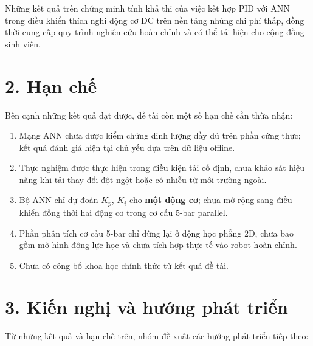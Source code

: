 Những kết quả trên chứng minh tính khả thi của việc kết hợp PID với ANN trong
điều khiển thích nghi động cơ DC trên nền tảng nhúng chi phí thấp, đồng thời
cung cấp quy trình nghiên cứu hoàn chỉnh và có thể tái hiện cho cộng đồng sinh viên.


\section*{2. Hạn chế}

Bên cạnh những kết quả đạt được, đề tài còn một số hạn chế cần thừa nhận:

\begin{enumerate}[leftmargin=1.5cm, label=\arabic*.]
    \item Mạng ANN chưa được kiểm chứng định lượng đầy đủ trên phần cứng thực;
    kết quả đánh giá hiện tại chủ yếu dựa trên dữ liệu offline.

    \item Thực nghiệm được thực hiện trong điều kiện tải cố định, chưa khảo sát
    hiệu năng khi tải thay đổi đột ngột hoặc có nhiễu từ môi trường ngoài.

    \item Bộ ANN chỉ dự đoán $K_p$, $K_i$ cho \textbf{một động cơ}; chưa mở rộng
    sang điều khiển đồng thời hai động cơ trong cơ cấu 5-bar parallel.

    \item Phần phân tích cơ cấu 5-bar chỉ dừng lại ở động học phẳng 2D, chưa
    bao gồm mô hình động lực học và chưa tích hợp thực tế vào robot hoàn chỉnh.

    \item Chưa có công bố khoa học chính thức từ kết quả đề tài.
\end{enumerate}


\section*{3. Kiến nghị và hướng phát triển}

Từ những kết quả và hạn chế trên, nhóm đề xuất các hướng phát triển tiếp theo:

